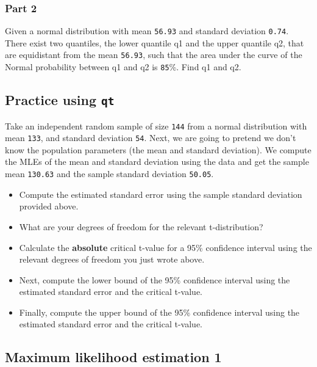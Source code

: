 \documentclass[12pt,]{krantz}
\providecommand{\tightlist}{%
  \setlength{\itemsep}{0pt}\setlength{\parskip}{0pt}}
\theoremstyle{definition}
\theoremstyle{definition}
\theoremstyle{definition}
\theoremstyle{remark}
\begin{document}
\hypertarget{part-2-1}{%
\subsubsection{Part 2}\label{part-2-1}}

Given a normal distribution with mean \texttt{56.93} and standard deviation \texttt{0.74}. There exist two quantiles, the lower quantile q1 and the upper quantile q2, that are equidistant from the mean \texttt{56.93}, such that the area under the curve of the Normal probability between q1 and q2 is \texttt{85}\%. Find q1 and q2.

\hypertarget{practice-using-qt}{%
\subsection{\texorpdfstring{Practice using \texttt{qt}}{Practice using qt}}\label{practice-using-qt}}

Take an independent random sample of size \texttt{144} from a normal distribution
with mean \texttt{133}, and standard deviation \texttt{54}. Next, we are going to pretend we don't know the population parameters (the mean and standard deviation). We compute the MLEs of the mean and standard deviation using the data and get the sample mean \texttt{130.63} and the sample standard deviation \texttt{50.05}.

\begin{itemize}
\tightlist
\item
  Compute the estimated standard error using the sample standard deviation provided above.
\item
  What are your degrees of freedom for the relevant t-distribution?
\item
  Calculate the \textbf{absolute} critical t-value for a 95\% confidence interval using the relevant degrees of freedom you just wrote above.
\item
  Next, compute the lower bound of the 95\% confidence interval using the estimated standard error and the critical t-value.
\item
  Finally, compute the upper bound of the 95\% confidence interval using the estimated standard error and the critical t-value.
\end{itemize}

\hypertarget{maximum-likelihood-estimation-1}{%
\subsection{Maximum likelihood estimation 1}\label{maximum-likelihood-estimation-1}}
\end{document}
